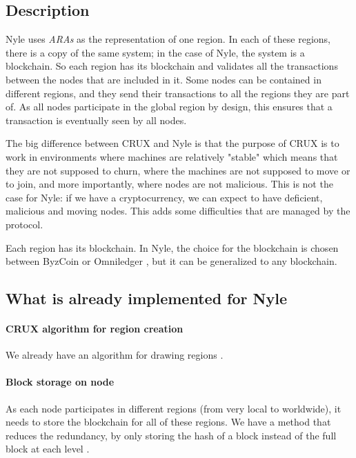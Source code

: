 \documentclass[a4paper,11pt,twoside=semi,openright]{report}
\begin{document}
\subsection{Description}

Nyle uses \textit{ARAs} as the representation of one region. In each of these
regions, there is a copy of the same system; in the case of Nyle, the
system is a blockchain. So each region has its blockchain and validates
all the transactions between the nodes that are included in it. Some nodes can
be contained in different regions, and they send their transactions to all
the regions they are part of. As all nodes participate in the global region by
design, this ensures that a transaction is eventually seen by all nodes.

The big difference between CRUX \cite{Basescu2014} and Nyle is that the purpose
of CRUX \cite{Basescu2014} is to work in environments where machines are
relatively "stable" which means that they are not supposed to churn,
where the machines are not supposed to move or to join, and more importantly,
where nodes are not malicious. This is not the case for Nyle: if we have a
cryptocurrency, we can expect to have deficient, malicious and moving nodes.
This adds some difficulties that are managed by the protocol.

Each region has its blockchain. In Nyle, the choice for the blockchain is
chosen between ByzCoin \cite{Kogias2016} or Omniledger
\cite{Kokoris-Kogias2017}, but it can be generalized to any blockchain.

\subsection{What is already implemented for Nyle} \paragraph{CRUX algorithm for
region creation} We already have an algorithm for drawing regions
\cite{Basescu2014}.

\paragraph{Block storage on node} As each node participates in different
regions (from very local to worldwide), it needs to store the blockchain
for all of these regions. We have a method that reduces the redundancy, by only
storing the hash of a block instead of the full block at each level
\cite{Sierro2019}. 
\end{document}
